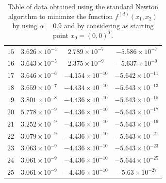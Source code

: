 \documentclass[a4paper,11pt]{article}
\begin{document}
\begin{table}[H]
\begin{tabular}{|c|c|c|c|}
			$15$ & $3.626\times10^{-4}$ & $2.789\times10^{-7}$ & $-5.586\times10^{-7}$ \\
			$16$ & $3.643\times10^{-5}$ & $2.375\times10^{-9}$ & $-5.637\times10^{-9}$ \\
			$17$ & $3.646\times10^{-6}$ & $-4.154\times10^{-10}$ & $-5.642\times10^{-11}$ \\
			$18$ & $3.659\times10^{-7}$ & $-4.434\times10^{-10}$ & $-5.643\times10^{-13}$ \\
			$19$ & $3.801\times10^{-8}$ & $-4.436\times10^{-10}$ & $-5.643\times10^{-15}$ \\
			$20$ & $5.778\times10^{-9}$ & $-4.436\times10^{-10}$ & $-5.643\times10^{-17}$ \\
			$21$ & $3.252\times10^{-9}$ & $-4.436\times10^{-10}$ & $-5.643\times10^{-19}$ \\
			$22$ & $3.079\times10^{-9}$ & $-4.436\times10^{-10}$ & $-5.643\times10^{-21}$ \\
			$23$ & $3.063\times10^{-9}$ & $-4.436\times10^{-10}$ & $-5.643\times10^{-23}$ \\
			$24$ & $3.061\times10^{-9}$ & $-4.436\times10^{-10}$ & $-5.644\times10^{-25}$ \\
			$25$ & $3.061\times10^{-9}$ & $-4.436\times10^{-10}$ & $-5.63\times10^{-27}$ \\
			\hline
		\end{tabular}
		\caption{Table of data obtained using the standard Newton algorithm to minimize the function $f^{(d)}(x_{1},x_{2})$ by using $\alpha=0.9$ and by considering as starting point $x_{0}=(0,0)^{T}$.}
	\end{table}
	
\end{document}
